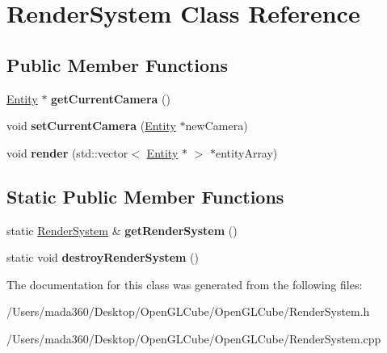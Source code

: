 \hypertarget{class_render_system}{}\section{Render\+System Class Reference}
\label{class_render_system}
\subsection*{Public Member Functions}
\begin{DoxyCompactItemize}
\item 
\hypertarget{class_render_system_a9e564b1fdbc1f2b192786565108604a9}{}\hyperlink{class_entity}{Entity} $\ast$ {\bfseries get\+Current\+Camera} ()\label{class_render_system_a9e564b1fdbc1f2b192786565108604a9}

\item 
\hypertarget{class_render_system_a29ddcb343529a9b6454508527f57845f}{}void {\bfseries set\+Current\+Camera} (\hyperlink{class_entity}{Entity} $\ast$new\+Camera)\label{class_render_system_a29ddcb343529a9b6454508527f57845f}

\item 
\hypertarget{class_render_system_a0ac3f7e1df83b3a44a6c4830d38bdd5e}{}void {\bfseries render} (std\+::vector$<$ \hyperlink{class_entity}{Entity} $\ast$ $>$ $\ast$entity\+Array)\label{class_render_system_a0ac3f7e1df83b3a44a6c4830d38bdd5e}

\end{DoxyCompactItemize}
\subsection*{Static Public Member Functions}
\begin{DoxyCompactItemize}
\item 
\hypertarget{class_render_system_a5e81ee19719a17b1ea8619305375d281}{}static \hyperlink{class_render_system}{Render\+System} \& {\bfseries get\+Render\+System} ()\label{class_render_system_a5e81ee19719a17b1ea8619305375d281}

\item 
\hypertarget{class_render_system_ae9cf102fb529432575d0df662d115ea9}{}static void {\bfseries destroy\+Render\+System} ()\label{class_render_system_ae9cf102fb529432575d0df662d115ea9}

\end{DoxyCompactItemize}


The documentation for this class was generated from the following files\+:\begin{DoxyCompactItemize}
\item 
/\+Users/mada360/\+Desktop/\+Open\+G\+L\+Cube/\+Open\+G\+L\+Cube/Render\+System.\+h\item 
/\+Users/mada360/\+Desktop/\+Open\+G\+L\+Cube/\+Open\+G\+L\+Cube/Render\+System.\+cpp\end{DoxyCompactItemize}
